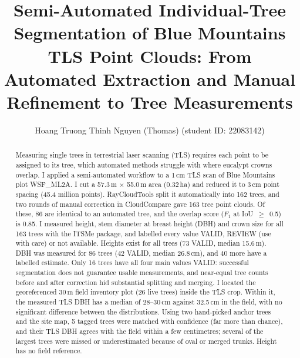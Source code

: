 \documentclass[runningheads]{llncs}
\begin{document}
\title{Semi-Automated Individual-Tree Segmentation of Blue Mountains TLS Point Clouds: From Automated Extraction and Manual Refinement to Tree Measurements}
\author{Hoang Truong Thinh Nguyen (Thomas) (student ID: 22083142)}
\authorrunning{\mbox{}}
\maketitle

\begin{abstract}
Measuring single trees in terrestrial laser scanning (TLS) requires each point to be assigned to its tree, which automated methods struggle with where eucalypt crowns overlap. I applied a semi-automated workflow to a 1\,cm TLS scan of Blue Mountains plot WSF\_ML2A. I cut a 57.3\,m $\times$ 55.0\,m area (0.32\,ha) and reduced it to 3\,cm point spacing (45.4 million points). RayCloudTools split it automatically into 162 trees, and two rounds of manual correction in CloudCompare gave 163 tree point clouds. Of these, 86 are identical to an automated tree, and the overlap score ($F_1$ at IoU~$\geq$~0.5) is 0.85. I measured height, stem diameter at breast height (DBH) and crown size for all 163 trees with the ITSMe package, and labelled every value VALID, REVIEW (use with care) or not available. Heights exist for all trees (73 VALID, median 15.6\,m). DBH was measured for 86 trees (42 VALID, median 26.8\,cm), and 40 more have a labelled estimate. Only 16 trees have all four main values VALID: successful segmentation does not guarantee usable measurements, and near-equal tree counts before and after correction hid substantial splitting and merging. I located the georeferenced 30\,m field inventory plot (26 live trees) inside the TLS crop. Within it, the measured TLS DBH has a median of 28--30\,cm against 32.5\,cm in the field, with no significant difference between the distributions. Using two hand-picked anchor trees and the site map, 5 tagged trees were matched with confidence (far more than chance), and their TLS DBH agrees with the field within a few centimetres; several of the largest trees were missed or underestimated because of oval or merged trunks. Height has no field reference.
\end{abstract}
\end{document}
